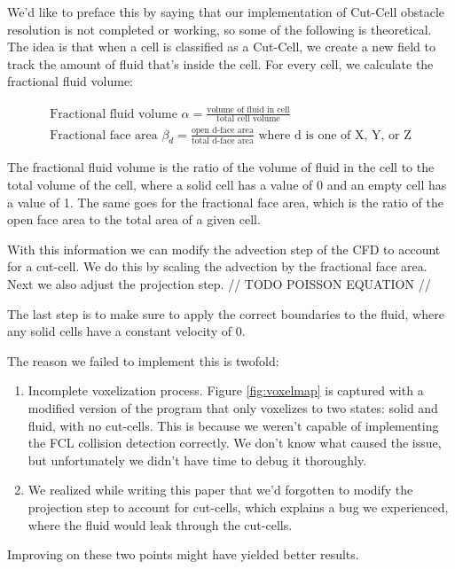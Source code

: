 \documentclass[a4paper,12pt,titlepage]{article}
\begin{document}
We'd like to preface this by saying that our implementation of Cut-Cell obstacle
resolution is not completed or working, so some of the following is theoretical.
The idea is that when a cell is classified as a Cut-Cell, we create a new field to
track the amount of fluid that's inside the cell. For every cell, we calculate the
fractional fluid volume:

\[
	\begin{array}{ll}
		\text{Fractional fluid volume } \alpha = \frac{\text{volume of fluid in cell}}{\text{total cell volume}} \\
		\text{Fractional face area } \beta_d = \frac{\text{open d-face area}}{\text{total d-face area}} \text{ where d is one of X, Y, or Z}
	\end{array}
\]

The fractional fluid volume is the ratio of the volume of fluid in the cell to the
total volume of the cell, where a solid cell has a value of 0 and an empty cell has
a value of 1. The same goes for the fractional face area, which is the ratio of the
open face area to the total area of a given cell.

With this information we can modify the advection step of the CFD to account for
a cut-cell. We do this by scaling the advection by the fractional face area. Next
we also adjust the projection step. // TODO POISSON EQUATION //

The last step is to make sure to apply the correct boundaries to the fluid,
where any solid cells have a constant velocity of 0.

The reason we failed to implement this is twofold:
\begin{enumerate}
	\item{
			Incomplete voxelization process. Figure \ref{fig:voxelmap} is
			captured with a modified version of the program that only voxelizes
			to two states: solid and fluid, with no cut-cells. This is because we
			weren't capable of implementing the FCL collision detection correctly.
			We don't know what caused the issue, but unfortunately we didn't have
			time to debug it thoroughly.
	}
	\item{
			We realized while writing this paper that we'd forgotten to modify the
			projection step to account for cut-cells, which explains a bug we experienced,
			where the fluid would leak through the cut-cells.
		}
\end{enumerate}

Improving on these two points might have yielded better results.
\end{document}

